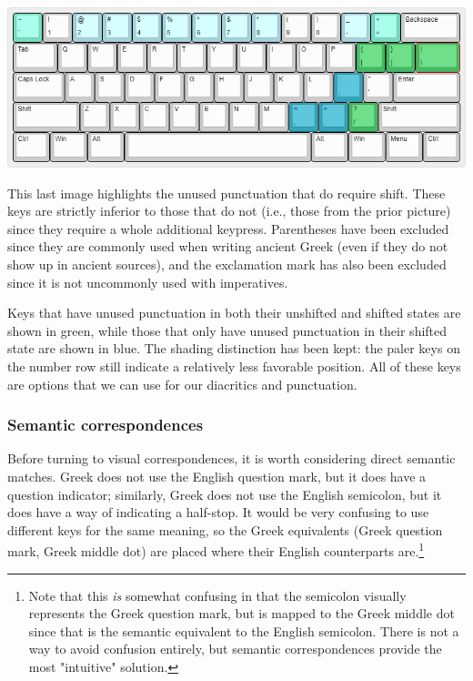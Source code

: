 \documentclass[11pt]{article}
\begin{document}
\begin{center}
\includegraphics[width=.9\linewidth]{./images/unused-shift.png}
\end{center}

This last image highlights the unused punctuation that do require shift. These keys are strictly inferior to those that do not (i.e., those from the prior picture) since they require a whole additional keypress. Parentheses have been excluded since they are commonly used when writing ancient Greek (even if they do not show up in ancient sources), and the exclamation mark has also been excluded since it is not uncommonly used with imperatives.

Keys that have unused punctuation in both their unshifted and shifted states are shown in green, while those that only have unused punctuation in their shifted state are shown in blue. The shading distinction has been kept: the paler keys on the number row still indicate a relatively less favorable position. All of these keys are options that we can use for our diacritics and punctuation.

\subsubsection{Semantic correspondences}
\label{sec:org4830c94}

Before turning to visual correspondences, it is worth considering direct semantic matches. Greek does not use the English question mark, but it does have a question indicator; similarly, Greek does not use the English semicolon, but it does have a way of indicating a half-stop. It would be very confusing to use different keys for the same meaning, so the Greek equivalents (Greek question mark, Greek middle dot) are placed where their English counterparts are.\footnote{Note that this \emph{is} somewhat confusing in that the semicolon visually represents the Greek question mark, but is mapped to the Greek middle dot since that is the semantic equivalent to the English semicolon. There is not a way to avoid confusion entirely, but semantic correspondences provide the most "intuitive" solution.}
\end{document}
